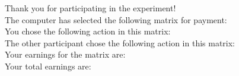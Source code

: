 \documentclass[11pt]{article}
\begin{document}
\begin{tcolorbox}
Thank you for participating in the experiment!\\

The computer has selected the following matrix for payment: \\

You chose the following action in this matrix:\\

The other participant chose the following action in this matrix:\\

Your earnings for the matrix are:\\

Your total earnings are:\\


\end{tcolorbox}
\end{document}
